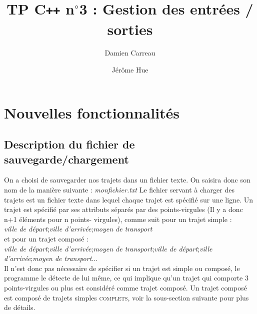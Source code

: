 \documentclass[a4paper]{article}
\title{TP C\texttt{++} n$^{\circ}$3 : Gestion des entrées / sorties}           %
\author{ Damien Carreau \and Jérôme Hue }
\begin{document}
\maketitle                    %



\tableofcontents              %


\section{Nouvelles fonctionnalités}         %






\subsection{Description du fichier de sauvegarde/chargement}

On a choisi de sauvegarder nos trajets dans un fichier texte. On saisira donc  son nom de la manière suivante : 
\textit{monfichier.txt}
Le fichier servant à charger des trajets est un fichier texte dans lequel chaque trajet est spécifié sur une ligne. Un trajet est spécifié par ses attributs séparés par des points-virgules (Il y a donc n+1 éléments pour n points-	virgules), comme suit pour un trajet simple : \\
\textit{ville de départ};\textit{ville d'arrivée};\textit{moyen de transport} \\
et pour un trajet composé : \\ 
\textit{ville de départ};\textit{ville d'arrivée};\textit{moyen de transport};\textit{ville de départ};\textit{ville d'arrivée};\textit{moyen de transport}... \\
Il n'est donc pas nécessaire de spécifier si un trajet est simple ou composé, le programme le détecte de lui même, ce qui implique qu'un trajet qui comporte 3 points-virgules ou plus est considéré comme trajet composé. Un trajet composé est composé de trajets simples \textsc{complets}, voir la sous-section suivante pour plus de détails.
\end{document}
